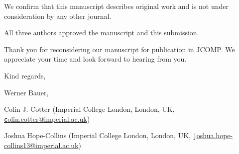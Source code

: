 \documentclass[a4paper,12pt]{article}
\begin{document}
\vspace{0.8em}

We confirm that this manuscript describes original work and is not under consideration by any other journal. 

All three authors approved the manuscript and this submission.

\vspace{0.8em}

Thank you for reconsidering our manuscript for publication in JCOMP. We appreciate your time and look forward to hearing from you.

\vspace{1.5em}

Kind regards,

\vspace{1.5em}

Werner Bauer,  \\

\vspace{-0.5em}

Colin J. Cotter
(Imperial College London, London, UK,
\href{mailto:colin.cotter@imperial.ac.uk}{\texttt colin.cotter@imperial.ac.uk})

Joshua Hope-Collins
(Imperial College London, London, UK,
\href{mailto:joshua.hope-collins13@imperial.ac.uk}{\texttt joshua.hope-collins13@imperial.ac.uk})
%
%



\end{document}
